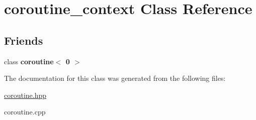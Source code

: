 \hypertarget{classcoroutine__context}{}\section{coroutine\+\_\+context Class Reference}
\label{classcoroutine__context}
\subsection*{Friends}
\begin{DoxyCompactItemize}
\item 
class {\bfseries coroutine$<$ 0 $>$}\hypertarget{classcoroutine__context_a874ca9b5dbeb1f6d90f61bc87474e164}{}\label{classcoroutine__context_a874ca9b5dbeb1f6d90f61bc87474e164}

\end{DoxyCompactItemize}


The documentation for this class was generated from the following files\+:\begin{DoxyCompactItemize}
\item 
\hyperlink{coroutine_8hpp}{coroutine.\+hpp}\item 
coroutine.\+cpp\end{DoxyCompactItemize}
